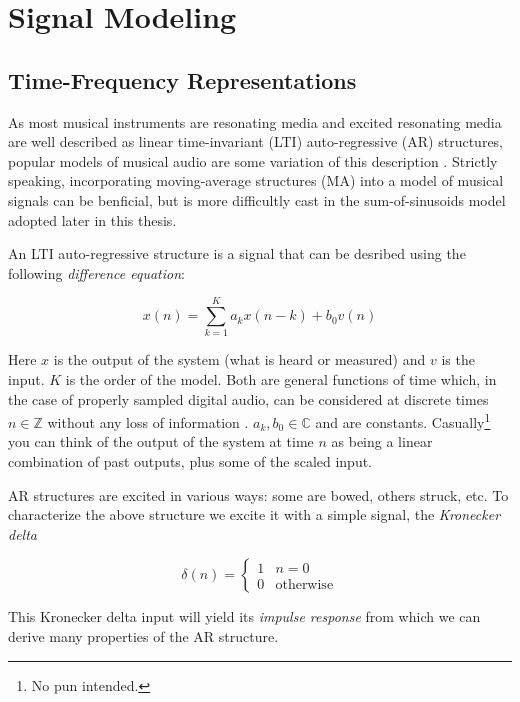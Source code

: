 \chapter{Signal Modeling}

\section{Time-Frequency Representations \label{sec:timefreqrep}}

As most musical instruments are resonating media and excited resonating media
are well described as linear time-invariant (LTI) auto-regressive (AR)
structures, popular models of musical audio are some variation of this
description \cite{fletcher2012physics}. Strictly speaking, incorporating
moving-average structures (MA) into a model of musical signals can be benficial,
but is more difficultly cast in the sum-of-sinusoids model adopted later in this
thesis.

An LTI auto-regressive structure is a signal that can be desribed using the
following \textit{difference equation}:

\begin{equation}
    x(n) = \sum_{k=1}^{K} a_k x(n-k) + b_0 v(n)
\end{equation}

Here $x$ is the output of the system (what is heard or measured) and $v$ is the
input. $K$ is the order of the model. Both are general functions of time which,
in the case of properly sampled digital audio, can be considered at discrete
times $n \in \mathbb{Z}$ without any loss of information
\cite[ch.~2]{crochiere1983multi}.  $a_k,b_0 \in \mathbb{C}$ and are constants.
Casually\footnote{No pun intended.} you can think of the output of the system at
time $n$ as being a linear combination of past outputs, plus some of the scaled
input.

AR structures are excited in various ways: some are bowed, others struck, etc.
To characterize the above structure we excite it with a simple signal, the
\textit{Kronecker delta}

\begin{equation}
    \delta(n) = \begin{cases}
        1 & n=0\\
        0 & \text{otherwise}
    \end{cases}
\end{equation}

This Kronecker delta input will yield its \textit{impulse
response} from which we can derive many properties of the AR structure.

